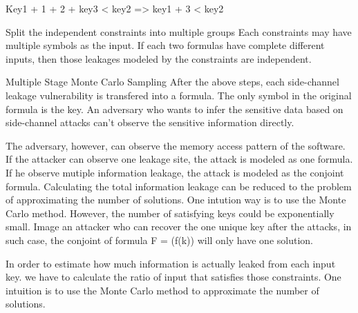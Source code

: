 Key1 + 1 + 2 + key3 < key2 => key1 + 3 < key2

Split the independent constraints into multiple groups
Each constraints may have multiple symbols as the input. 
If each two formulas have complete different inputs,
then those leakages modeled by the constraints are independent. 

Multiple Stage Monte Carlo Sampling
After the above steps, each side-channel leakage vulnerability is 
transfered into a formula. The only symbol in the original formula is the key. 
An adversary who wants to infer the sensitive data based on side-channel 
attacks can’t observe the sensitive information directly. 

The adversary, however, can observe the memory access pattern of the software. 
If the attacker can observe one leakage site, the attack is modeled as one formula. 
If he observe mutiple information leakage, the attack is modeled as the conjoint formula.
Calculating the total information leakage can be reduced to the problem of approximating 
the number of solutions. One intution way is to use the Monte Carlo method. However, 
the number of satisfying keys could be exponentially small. Image an attacker 
who can recover the one unique key after the attacks, in such case, 
the conjoint of formula F = (f(k)) will only have one solution.

In order to estimate how much information is actually leaked from each input key.
we have to calculate the ratio of input that satisfies those constraints. 
One intuition is to use the Monte Carlo method to approximate the number of solutions. 